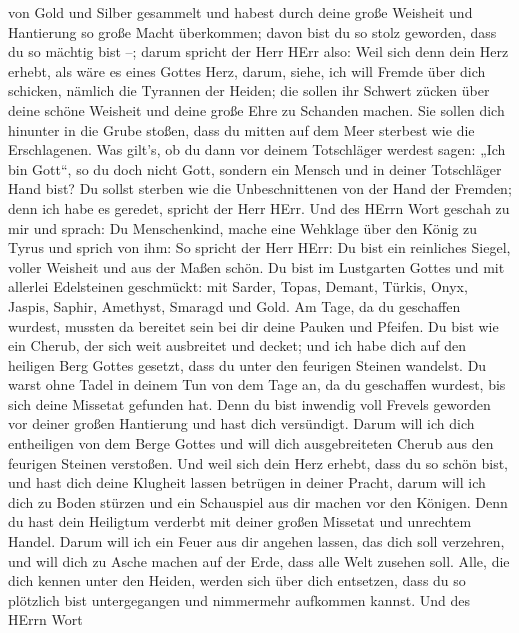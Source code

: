 von Gold und Silber gesammelt  und habest durch deine große
Weisheit und Hantierung so große Macht überkommen; davon bist du so
stolz geworden, dass du so mächtig bist --;  darum spricht
der Herr HErr also: Weil sich denn dein Herz erhebt, als wäre es eines
Gottes Herz,  darum, siehe, ich will Fremde über dich
schicken, nämlich die Tyrannen der Heiden; die sollen ihr Schwert zücken
über deine schöne Weisheit und deine große Ehre zu Schanden machen.
 Sie sollen dich hinunter in die Grube stoßen, dass du
mitten auf dem Meer sterbest wie die Erschlagenen.  Was
gilt's, ob du dann vor deinem Totschläger werdest sagen: „Ich bin
Gott``, so du doch nicht Gott, sondern ein Mensch und in deiner
Totschläger Hand bist?  Du sollst sterben wie die
Unbeschnittenen von der Hand der Fremden; denn ich habe es geredet,
spricht der Herr HErr.  Und des HErrn Wort geschah zu mir
und sprach:  Du Menschenkind, mache eine Wehklage über den
König zu Tyrus und sprich von ihm: So spricht der Herr HErr: Du bist ein
reinliches Siegel, voller Weisheit und aus der Maßen schön.
 Du bist im Lustgarten Gottes und mit allerlei Edelsteinen
geschmückt: mit Sarder, Topas, Demant, Türkis, Onyx, Jaspis, Saphir,
Amethyst, Smaragd und Gold. Am Tage, da du geschaffen wurdest, mussten
da bereitet sein bei dir deine Pauken und Pfeifen.  Du bist
wie ein Cherub, der sich weit ausbreitet und decket; und ich habe dich
auf den heiligen Berg Gottes gesetzt, dass du unter den feurigen Steinen
wandelst.  Du warst ohne Tadel in deinem Tun von dem Tage
an, da du geschaffen wurdest, bis sich deine Missetat gefunden hat.
 Denn du bist inwendig voll Frevels geworden vor deiner
großen Hantierung und hast dich versündigt. Darum will ich dich
entheiligen von dem Berge Gottes und will dich ausgebreiteten Cherub aus
den feurigen Steinen verstoßen.  Und weil sich dein Herz
erhebt, dass du so schön bist, und hast dich deine Klugheit lassen
betrügen in deiner Pracht, darum will ich dich zu Boden stürzen und ein
Schauspiel aus dir machen vor den Königen.  Denn du hast
dein Heiligtum verderbt mit deiner großen Missetat und unrechtem Handel.
Darum will ich ein Feuer aus dir angehen lassen, das dich soll
verzehren, und will dich zu Asche machen auf der Erde, dass alle Welt
zusehen soll.  Alle, die dich kennen unter den Heiden,
werden sich über dich entsetzen, dass du so plötzlich bist untergegangen
und nimmermehr aufkommen kannst.  Und des HErrn Wort
